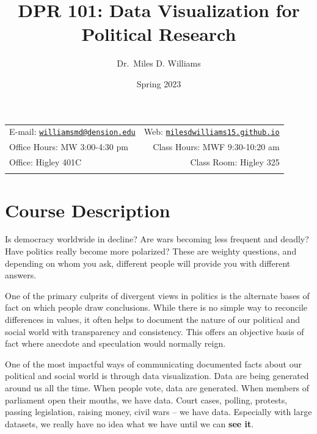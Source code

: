 \documentclass[11pt,]{article}
\title{DPR 101: Data Visualization for Political Research}
\author{Dr.~Miles D. Williams}
\date{Spring 2023}
\begin{document}
		\maketitle
	

		\thispagestyle{firststyle}



	\noindent \begin{tabular*}{\textwidth}{ @{\extracolsep{\fill}} lr @{\extracolsep{\fill}}}


E-mail: \texttt{\href{mailto:williamsmd@dension.edu}{\nolinkurl{williamsmd@dension.edu}}} & Web: \href{http://milesdwilliams15.github.io}{\tt milesdwilliams15.github.io}\\
Office Hours: MW 3:00-4:30 pm  &  Class Hours: MWF 9:30-10:20 am\\
Office: Higley 401C  & Class Room: Higley 325\\
	&  \\
	\hline
	\end{tabular*}

\vspace{2mm}



\hypertarget{course-description}{%
\section{Course Description}\label{course-description}}

Is democracy worldwide in decline? Are wars becoming less frequent and
deadly? Have politics really become more polarized? These are weighty
questions, and depending on whom you ask, different people will provide
you with different answers.

One of the primary culprits of divergent views in politics is the
alternate bases of fact on which people draw conclusions. While there is
no simple way to reconcile differences in values, it often helps to
document the nature of our political and social world with transparency
and consistency. This offers an objective basis of fact where anecdote
and speculation would normally reign.

One of the most impactful ways of communicating documented facts about
our political and social world is through data visualization. Data are
being generated around us all the time. When people vote, data are
generated. When members of parliament open their mouths, we have data.
Court cases, polling, protests, passing legislation, raising money,
civil wars -- we have data. Especially with large datasets, we really
have no idea what we have until we can \textbf{see it}.
\end{document}
